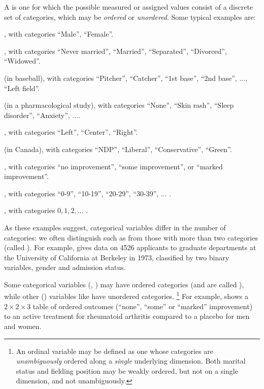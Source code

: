 \documentclass[11pt]{book}
\begin{document}
A  is one for which the possible measured
or assigned values
consist of a discrete set of categories, which may be \emph{ordered} or
\emph{unordered}.
Some typical examples are:
\begin{itemize*}
\item {}, with categories ``Male'', ``Female''.
\item {}, with categories ``Never married'', ``Married'',
``Separated'', ``Divorced'', ``Widowed''.
\item {} (in baseball), with categories
``Pitcher'', ``Catcher'', ``1st base'', ``2nd base'',  $\dots$, ``Left field''.
\item {} (in a pharmacological study), with categories
``None'', ``Skin rash'', ``Sleep disorder'', ``Anxiety'', $\dots$.
\item {}, with categories ``Left'', ``Center'', ``Right''.
\item {} (in Canada), with categories ``NDP'', ``Liberal'', ``Conservative'', ``Green''.
\item {}, with categories ``no improvement'', ``some
improvement'', or ``marked improvement''.
\item {}, with categories ``0-9'', ``10-19'', ``20-29'', ``30-39'', 
$\dots$ .
\item {}, with categories $0, 1, 2, \dots$ .
\end{itemize*}

As these examples suggest, categorical variables differ in the number of
categories: we often distinguish 
 such as 
from those with more than two categories (called ).
For example,  gives data on 4526 applicants
to graduate departments at the University of California at Berkeley
in 1973, classified by two binary variables, gender and admission status.


Some categorical variables (, )
may have ordered categories (and are called ),
while other () variables like 
have unordered categories.%
\footnote{An ordinal variable may be defined as one whose categories are
\emph{unambiguously} ordered along a \emph{single} underlying dimension.
Both marital status and fielding position may be weakly ordered, but
not on a single dimension, and not unambiguously.} 
For example,  shows a $2 \times 2 \times 3$ table of 
ordered outcomes (``none'', ``some'' or ``marked'' improvement)
to an active treatment for rheumatoid
arthritis compared to a placebo for men and women.

\end{document}
